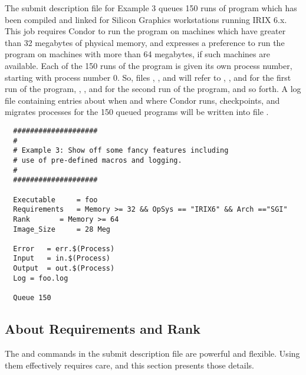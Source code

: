 The submit description file for Example 3 queues 150
runs of program  which has been compiled and linked for
Silicon Graphics workstations running IRIX 6.x. 
This job requires Condor 
to run the program on machines which have greater than 32 megabytes of
physical memory, and expresses a preference to run the program
on machines with more than 64 megabytes, if such machines are available.
Each of the 150 runs of the program is given its own process number,
starting with process number 0.
So, files 
, , and  will
refer to , , and  for the first run
of the program,
, ,
and  for the second run of the program, and so forth.
A log file containing entries
about when and where Condor runs, checkpoints, and migrates processes for
the 150 queued programs
will be written into file .
\begin{verbatim}
  ####################                    
  #
  # Example 3: Show off some fancy features including
  # use of pre-defined macros and logging.
  #
  ####################                                                    

  Executable     = foo                                                    
  Requirements   = Memory >= 32 && OpSys == "IRIX6" && Arch =="SGI"     
  Rank		 = Memory >= 64
  Image_Size     = 28 Meg                                                 

  Error   = err.$(Process)                                                
  Input   = in.$(Process)                                                 
  Output  = out.$(Process)                                                
  Log = foo.log

  Queue 150
\end{verbatim}


\subsection{About Requirements and Rank}

The 
 and  commands in the submit description file
are powerful and flexible. 
Using them effectively requires care, and this section presents
those details.

